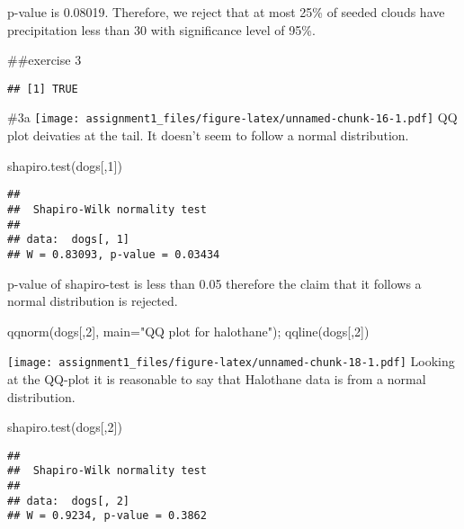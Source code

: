 \documentclass[
]{article}
\newenvironment{Shaded}{\begin{snugshade}}{\end{snugshade}}
\newcommand{\AttributeTok}[1]{\textcolor[rgb]{0.77,0.63,0.00}{#1}}
\newcommand{\DecValTok}[1]{\textcolor[rgb]{0.00,0.00,0.81}{#1}}
\newcommand{\FunctionTok}[1]{\textcolor[rgb]{0.00,0.00,0.00}{#1}}
\newcommand{\NormalTok}[1]{#1}
\newcommand{\StringTok}[1]{\textcolor[rgb]{0.31,0.60,0.02}{#1}}
\begin{document}
p-value is 0.08019. Therefore, we reject that at most 25\% of seeded
clouds have precipitation less than 30 with significance level of 95\%.

\#\#exercise 3

\begin{verbatim}
## [1] TRUE
\end{verbatim}

\#3a
\texttt{[image: assignment1\_files/figure-latex/unnamed-chunk-16-1.pdf]}
QQ plot deivaties at the tail. It doesn't seem to follow a normal
distribution.

\begin{Shaded}
\begin{Highlighting}[]
\FunctionTok{shapiro.test}\NormalTok{(dogs[,}\DecValTok{1}\NormalTok{])}
\end{Highlighting}
\end{Shaded}

\begin{verbatim}
## 
##  Shapiro-Wilk normality test
## 
## data:  dogs[, 1]
## W = 0.83093, p-value = 0.03434
\end{verbatim}

p-value of shapiro-test is less than 0.05 therefore the claim that it
follows a normal distribution is rejected.

\begin{Shaded}
\begin{Highlighting}[]
\FunctionTok{qqnorm}\NormalTok{(dogs[,}\DecValTok{2}\NormalTok{], }\AttributeTok{main=}\StringTok{"QQ plot for halothane"}\NormalTok{); }\FunctionTok{qqline}\NormalTok{(dogs[,}\DecValTok{2}\NormalTok{])}
\end{Highlighting}
\end{Shaded}

\texttt{[image: assignment1\_files/figure-latex/unnamed-chunk-18-1.pdf]}
Looking at the QQ-plot it is reasonable to say that Halothane data is
from a normal distribution.

\begin{Shaded}
\begin{Highlighting}[]
\FunctionTok{shapiro.test}\NormalTok{(dogs[,}\DecValTok{2}\NormalTok{])}
\end{Highlighting}
\end{Shaded}

\begin{verbatim}
## 
##  Shapiro-Wilk normality test
## 
## data:  dogs[, 2]
## W = 0.9234, p-value = 0.3862
\end{verbatim}
\end{document}

